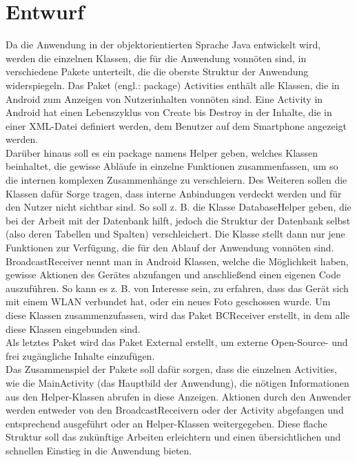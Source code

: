 \documentclass[10pt, a4paper,headsepline,pointednumbers]{scrreprt}
\begin{document}
\section{Entwurf}
Da die Anwendung in der objektorientierten Sprache Java entwickelt wird, werden die einzelnen Klassen, die für die Anwendung vonnöten sind, in verschiedene Pakete unterteilt, die die oberste Struktur der Anwendung widerspiegeln. Das Paket (engl.: package)  Activities enthält alle Klassen, die in Android zum Anzeigen von Nutzerinhalten vonnöten sind. Eine Activity in Android hat einen Lebenszyklus von Create bis Destroy in der Inhalte, die in einer XML-Datei definiert werden, dem Benutzer auf dem Smartphone angezeigt werden. \\
Darüber hinaus soll es ein package namens Helper geben, welches Klassen beinhaltet, die gewisse Abläufe in einzelne Funktionen zusammenfassen, um so die internen komplexen Zusammenhänge zu verschleiern. Des Weiteren sollen die Klassen dafür Sorge tragen, dass interne Anbindungen verdeckt werden und für den Nutzer nicht sichtbar sind. So soll z. B. die Klasse DatabaseHelper geben, die bei der Arbeit mit der Datenbank hilft, jedoch die Struktur der Datenbank selbst (also deren Tabellen und Spalten) verschleichert. Die Klasse stellt dann nur jene Funktionen zur Verfügung, die für den Ablauf der Anwendung vonnöten sind. \\
BroadcastReceiver nennt man in Android Klassen, welche die Möglichkeit haben, gewisse Aktionen des Gerätes abzufangen und anschließend einen eigenen Code auszuführen. So kann es z. B. von Interesse sein, zu erfahren, dass das Gerät sich mit einem WLAN verbundet hat, oder ein neues Foto geschossen wurde. Um diese Klassen zusammenzufassen, wird das Paket BCReceiver erstellt, in dem alle diese Klassen eingebunden sind. \\
Als letztes Paket wird das Paket External erstellt, um externe Open-Source- und frei zugängliche Inhalte einzufügen. \\
Das Zusammenspiel der Pakete soll dafür sorgen, dass die einzelnen Activities, wie die MainActivity (das Hauptbild der Anwendung), die nötigen Informationen aus den Helper-Klassen abrufen in diese Anzeigen. Aktionen durch den Anwender werden entweder von den BroadcastReceivern oder der Activity abgefangen und entsprechend ausgeführt oder an Helper-Klassen weitergegeben.  Diese flache Struktur soll das zukünftige Arbeiten erleichtern und einen übersichtlichen und schnellen Einstieg in die Anwendung bieten. \\ \\
\end{document}

